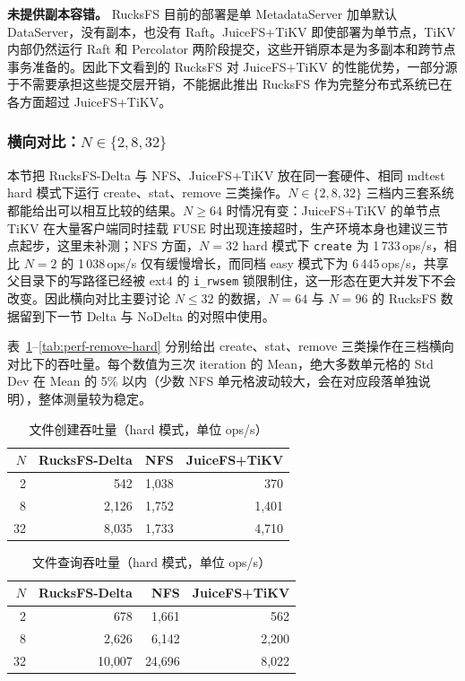 \textbf{未提供副本容错。} RucksFS 目前的部署是单 MetadataServer 加单默认 DataServer，没有副本，也没有 Raft。JuiceFS+TiKV 即使部署为单节点，TiKV 内部仍然运行 Raft 和 Percolator 两阶段提交\cite{peng2010large}，这些开销原本是为多副本和跨节点事务准备的。因此下文看到的 RucksFS 对 JuiceFS+TiKV 的性能优势，一部分源于不需要承担这些提交层开销，不能据此推出 RucksFS 作为完整分布式系统已在各方面超过 JuiceFS+TiKV。

\subsubsection{横向对比：\texorpdfstring{$N \in \{2, 8, 32\}$}{N in {2, 8, 32}}}
\label{sec:perf-horizontal}

本节把 RucksFS-Delta 与 NFS、JuiceFS+TiKV 放在同一套硬件、相同 mdtest hard 模式下运行 create、stat、remove 三类操作。$N \in \{2, 8, 32\}$ 三档内三套系统都能给出可以相互比较的结果。$N \geq 64$ 时情况有变：JuiceFS+TiKV 的单节点 TiKV 在大量客户端同时挂载 FUSE 时出现连接超时，生产环境本身也建议三节点起步，这里未补测；NFS 方面，$N=32$ hard 模式下 \texttt{create} 为 1\,733\,ops/s，相比 $N=2$ 的 1\,038\,ops/s 仅有缓慢增长，而同档 easy 模式下为 6\,445\,ops/s，共享父目录下的写路径已经被 ext4 的 \texttt{i\_rwsem} 锁限制住，这一形态在更大并发下不会改变。因此横向对比主要讨论 $N \leq 32$ 的数据，$N=64$ 与 $N=96$ 的 RucksFS 数据留到下一节 Delta 与 NoDelta 的对照中使用。

表~\ref{tab:perf-create-hard}--\ref{tab:perf-remove-hard} 分别给出 create、stat、remove 三类操作在三档横向对比下的吞吐量。每个数值为三次 iteration 的 Mean，绝大多数单元格的 Std Dev 在 Mean 的 5\% 以内（少数 NFS 单元格波动较大，会在对应段落单独说明），整体测量较为稳定。

\begin{table}[htbp]
    \centering
    \caption{文件创建吞吐量（hard 模式，单位 ops/s）}
    \label{tab:perf-create-hard}
    \small
    \begin{tabular}{rrrr}
        \toprule
        $N$ & RucksFS-Delta & NFS & JuiceFS+TiKV \\
        \midrule
        2  & 542    & 1{,}038 & 370   \\
        8  & 2{,}126  & 1{,}752 & 1{,}401 \\
        32 & 8{,}035  & 1{,}733 & 4{,}710 \\
        \bottomrule
    \end{tabular}
\end{table}

\begin{table}[htbp]
    \centering
    \caption{文件查询吞吐量（hard 模式，单位 ops/s）}
    \label{tab:perf-stat-hard}
    \small
    \begin{tabular}{rrrr}
        \toprule
        $N$ & RucksFS-Delta & NFS & JuiceFS+TiKV \\
        \midrule
        2  & 678     & 1{,}661  & 562    \\
        8  & 2{,}626   & 6{,}142  & 2{,}200 \\
        32 & 10{,}007  & 24{,}696 & 8{,}022 \\
        \bottomrule
    \end{tabular}
\end{table}

